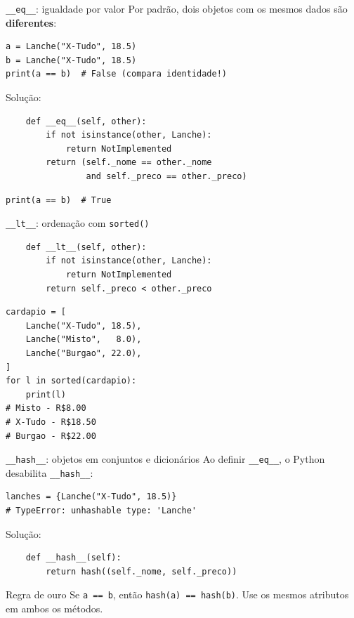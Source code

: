 \documentclass[aspectratio=169]{beamer}
\begin{document}
\begin{frame}[fragile]{\texttt{\_\_eq\_\_}: igualdade por valor}
Por padrão, dois objetos com os mesmos dados são \textbf{diferentes}:

\begin{lstlisting}
a = Lanche("X-Tudo", 18.5)
b = Lanche("X-Tudo", 18.5)
print(a == b)  # False (compara identidade!)
\end{lstlisting}

Solução:
\begin{lstlisting}
    def __eq__(self, other):
        if not isinstance(other, Lanche):
            return NotImplemented
        return (self._nome == other._nome
                and self._preco == other._preco)
\end{lstlisting}

\begin{lstlisting}
print(a == b)  # True
\end{lstlisting}
\end{frame}

\begin{frame}[fragile]{\texttt{\_\_lt\_\_}: ordenação com \texttt{sorted()}}
\begin{lstlisting}
    def __lt__(self, other):
        if not isinstance(other, Lanche):
            return NotImplemented
        return self._preco < other._preco
\end{lstlisting}

\begin{lstlisting}
cardapio = [
    Lanche("X-Tudo", 18.5),
    Lanche("Misto",   8.0),
    Lanche("Burgao", 22.0),
]
for l in sorted(cardapio):
    print(l)
# Misto - R$8.00
# X-Tudo - R$18.50
# Burgao - R$22.00
\end{lstlisting}
\end{frame}

\begin{frame}[fragile]{\texttt{\_\_hash\_\_}: objetos em conjuntos e dicionários}
Ao definir \texttt{\_\_eq\_\_}, o Python desabilita \texttt{\_\_hash\_\_}:

\begin{lstlisting}
lanches = {Lanche("X-Tudo", 18.5)}
# TypeError: unhashable type: 'Lanche'
\end{lstlisting}

Solução:
\begin{lstlisting}
    def __hash__(self):
        return hash((self._nome, self._preco))
\end{lstlisting}

\begin{alertblock}{Regra de ouro}
Se \texttt{a == b}, então \texttt{hash(a) == hash(b)}.
Use os mesmos atributos em ambos os métodos.
\end{alertblock}
\end{frame}
\end{document}
